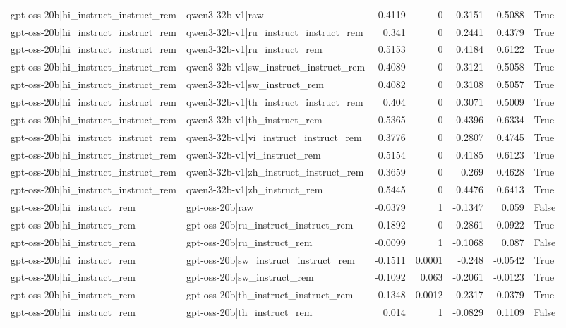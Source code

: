 \begin{table}
\begin{tabular}{l l r r r r l}
gpt-oss-20b|hi_instruct_instruct_rem & qwen3-32b-v1|raw & 0.4119 & 0 & 0.3151 & 0.5088 & True \\
gpt-oss-20b|hi_instruct_instruct_rem & qwen3-32b-v1|ru_instruct_instruct_rem & 0.341 & 0 & 0.2441 & 0.4379 & True \\
gpt-oss-20b|hi_instruct_instruct_rem & qwen3-32b-v1|ru_instruct_rem & 0.5153 & 0 & 0.4184 & 0.6122 & True \\
gpt-oss-20b|hi_instruct_instruct_rem & qwen3-32b-v1|sw_instruct_instruct_rem & 0.4089 & 0 & 0.3121 & 0.5058 & True \\
gpt-oss-20b|hi_instruct_instruct_rem & qwen3-32b-v1|sw_instruct_rem & 0.4082 & 0 & 0.3108 & 0.5057 & True \\
gpt-oss-20b|hi_instruct_instruct_rem & qwen3-32b-v1|th_instruct_instruct_rem & 0.404 & 0 & 0.3071 & 0.5009 & True \\
gpt-oss-20b|hi_instruct_instruct_rem & qwen3-32b-v1|th_instruct_rem & 0.5365 & 0 & 0.4396 & 0.6334 & True \\
gpt-oss-20b|hi_instruct_instruct_rem & qwen3-32b-v1|vi_instruct_instruct_rem & 0.3776 & 0 & 0.2807 & 0.4745 & True \\
gpt-oss-20b|hi_instruct_instruct_rem & qwen3-32b-v1|vi_instruct_rem & 0.5154 & 0 & 0.4185 & 0.6123 & True \\
gpt-oss-20b|hi_instruct_instruct_rem & qwen3-32b-v1|zh_instruct_instruct_rem & 0.3659 & 0 & 0.269 & 0.4628 & True \\
gpt-oss-20b|hi_instruct_instruct_rem & qwen3-32b-v1|zh_instruct_rem & 0.5445 & 0 & 0.4476 & 0.6413 & True \\
gpt-oss-20b|hi_instruct_rem & gpt-oss-20b|raw & -0.0379 & 1 & -0.1347 & 0.059 & False \\
gpt-oss-20b|hi_instruct_rem & gpt-oss-20b|ru_instruct_instruct_rem & -0.1892 & 0 & -0.2861 & -0.0922 & True \\
gpt-oss-20b|hi_instruct_rem & gpt-oss-20b|ru_instruct_rem & -0.0099 & 1 & -0.1068 & 0.087 & False \\
gpt-oss-20b|hi_instruct_rem & gpt-oss-20b|sw_instruct_instruct_rem & -0.1511 & 0.0001 & -0.248 & -0.0542 & True \\
gpt-oss-20b|hi_instruct_rem & gpt-oss-20b|sw_instruct_rem & -0.1092 & 0.063 & -0.2061 & -0.0123 & True \\
gpt-oss-20b|hi_instruct_rem & gpt-oss-20b|th_instruct_instruct_rem & -0.1348 & 0.0012 & -0.2317 & -0.0379 & True \\
gpt-oss-20b|hi_instruct_rem & gpt-oss-20b|th_instruct_rem & 0.014 & 1 & -0.0829 & 0.1109 & False \\

\end{tabular}
\end{table}
